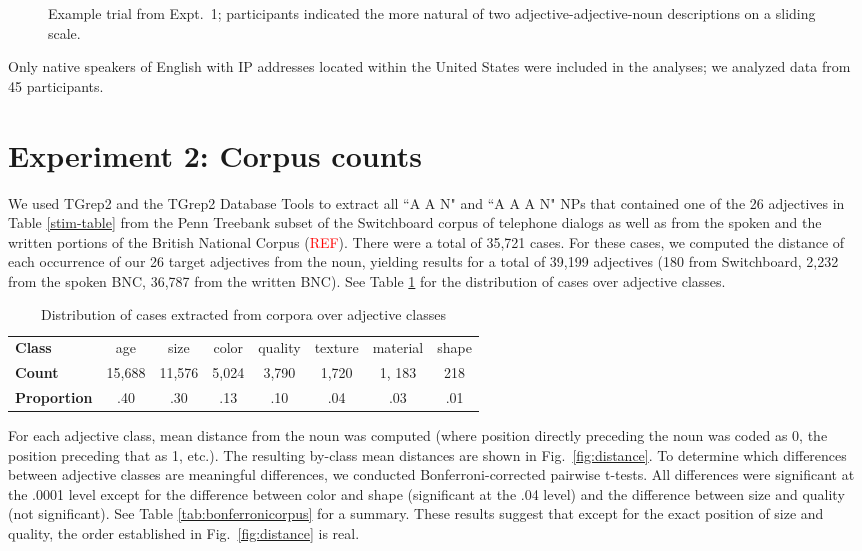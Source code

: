 \documentclass{pnastwo}
\newcommand{\tableref}[1]{Table \ref{#1}}
\newcommand{\figref}[1]{Fig.~\ref{#1}}
\newcommand{\red}[1]{\textcolor{Red}{#1}}
\begin{document}
\begin{article}
\begin{materials}
\begin{figure}[h!]
	\centering
	\caption{Example trial from Expt.\ 1; participants indicated the more natural of two adjective-adjective-noun descriptions on a sliding scale.}\label{order-trial}
\end{figure}

Only native speakers of English with IP addresses located within the United States were included in the analyses; we analyzed data from 45 participants.	
	
\section{Experiment 2: Corpus counts} 
We used TGrep2 \cite{rohde2005} and the TGrep2 Database Tools \cite{degenjaeger-tdt} to extract all ``A A N" and ``A A A N" NPs that contained one of the 26 adjectives in Table \ref{stim-table} from the Penn Treebank subset of the Switchboard corpus of telephone dialogs \cite{godfrey1992} as well as from the spoken and the written portions of the British National Corpus (\red{REF}). There were a total of 35,721 cases. For these cases, we computed the distance of each occurrence of our 26 target adjectives from the noun, yielding results for a total of 39,199 adjectives (180 from Switchboard, 2,232 from the spoken BNC, 36,787 from the written BNC).  See \tableref{tab:adjdist} for the distribution of cases over adjective classes.

\begin{table}[t]
	\caption{Distribution of cases extracted from corpora over adjective classes}
	\begin{tabular}{l c c c c c c c}
		\textbf{Class} & age & size & color & quality & texture & material & shape \\
		\textbf{Count} & 15,688 & 11,576 & 5,024 & 3,790 & 1,720 & 1, 183 & 218 \\
		\textbf{Proportion} & .40 & .30 & .13 & .10 & .04 & .03 & .01
	\end{tabular}
	\label{tab:adjdist}
\end{table}

For each adjective class, mean distance from the noun was computed (where position directly preceding the noun was coded as 0, the position preceding that as 1, etc.). The resulting by-class mean distances are shown in \figref{fig:distance}. To determine which differences between adjective classes are meaningful differences, we conducted Bonferroni-corrected pairwise t-tests. All differences were significant at the .0001 level except for the difference between color and shape (significant at the .04 level) and the difference between size and quality (not significant). See \tableref{tab:bonferronicorpus} for a summary. These results suggest that except for the exact position of size and quality, the order established in \figref{fig:distance} is real.




\end{materials}
\end{article}
\end{document}
